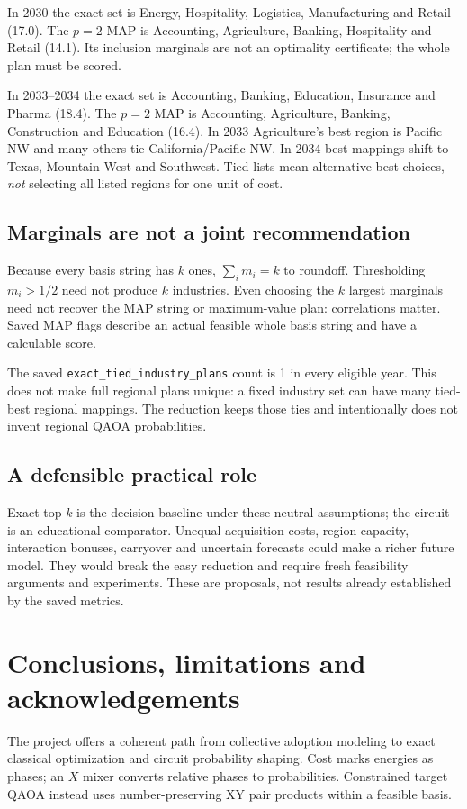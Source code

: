 \documentclass[11pt,letterpaper]{article}
\newcommand{\file}[1]{\nolinkurl{#1}}
\begin{document}
In 2030 the exact set is Energy, Hospitality, Logistics, Manufacturing and Retail (17.0). The $p=2$ MAP is Accounting, Agriculture, Banking, Hospitality and Retail (14.1). Its inclusion marginals are not an optimality certificate; the whole plan must be scored.

In 2033--2034 the exact set is Accounting, Banking, Education, Insurance and Pharma (18.4). The $p=2$ MAP is Accounting, Agriculture, Banking, Construction and Education (16.4). In 2033 Agriculture's best region is Pacific NW and many others tie California/Pacific NW. In 2034 best mappings shift to Texas, Mountain West and Southwest. Tied lists mean alternative best choices, \emph{not} selecting all listed regions for one unit of cost.

\subsection{Marginals are not a joint recommendation}
Because every basis string has $k$ ones, $\sum_i m_i=k$ to roundoff. Thresholding $m_i>1/2$ need not produce $k$ industries. Even choosing the $k$ largest marginals need not recover the MAP string or maximum-value plan: correlations matter. Saved MAP flags describe an actual feasible whole basis string and have a calculable score.

The saved \file{exact_tied_industry_plans} count is 1 in every eligible year. This does not make full regional plans unique: a fixed industry set can have many tied-best regional mappings. The reduction keeps those ties and intentionally does not invent regional QAOA probabilities.

\subsection{A defensible practical role}
Exact top-$k$ is the decision baseline under these neutral assumptions; the circuit is an educational comparator. Unequal acquisition costs, region capacity, interaction bonuses, carryover and uncertain forecasts could make a richer future model. They would break the easy reduction and require fresh feasibility arguments and experiments. These are proposals, not results already established by the saved metrics.
\section{Conclusions, limitations and acknowledgements}\label{sec:conclusion}
The project offers a coherent path from collective adoption modeling to exact classical optimization and circuit probability shaping. Cost marks energies as phases; an $X$ mixer converts relative phases to probabilities. Constrained target QAOA instead uses number-preserving XY pair products within a feasible basis.
\end{document}
